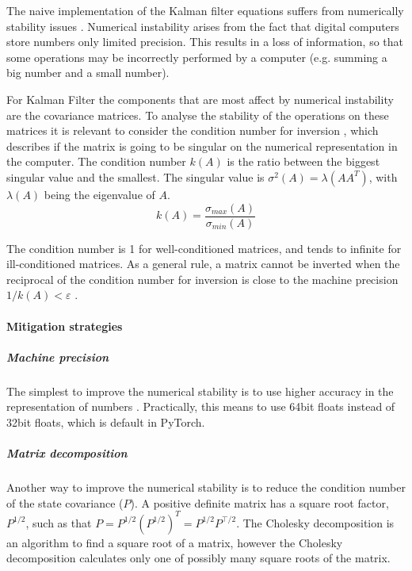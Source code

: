 \documentclass{article}
\begin{document}
The naive implementation of the Kalman filter equations suffers from numerically stability issues \cite{mohinder_s_grewal_kalman_2001, dan_simon_optimal_2006}. %
Numerical instability arises from the fact that digital computers store numbers only limited precision. This results in a loss of information, so that some operations may be incorrectly performed by a  computer (e.g. summing a big number and a small number).

For Kalman Filter the components that are most affect by numerical instability are the covariance matrices. To analyse the stability of the operations on these matrices it is relevant to consider the condition number for inversion \cite{mohinder_s_grewal_kalman_2001, kaminski_discrete_1971}, which describes if the matrix is going to be singular on the numerical representation in the computer. The condition number $k(A)$ is the ratio between the biggest singular value and the smallest. The singular value is $\sigma^2(A) = \lambda(AA^T)$, with  $\lambda(A)$ being the eigenvalue of $A$.
\begin{equation}\label{condition_number}
    k(A) = \frac{\sigma_{max}(A)}{\sigma_{min}(A)}
\end{equation}

The condition number is 1 for well-conditioned matrices, and tends to infinite for ill-conditioned matrices. As a general rule,  a matrix cannot be inverted when the reciprocal of the condition number for inversion is close to the machine precision $ 1/k(A) < \varepsilon$ \cite{mohinder_s_grewal_kalman_2001}.

\paragraph{Mitigation strategies}

\subparagraph{Machine precision} The simplest to improve the numerical stability is to use higher accuracy in the representation of numbers \cite{dan_simon_optimal_2006}. Practically, this means to use 64bit floats instead of 32bit floats, which is default in PyTorch.

\subparagraph{Matrix decomposition} Another way to improve the numerical stability is to reduce the condition number of the state covariance ($P$). A positive definite matrix has a square root factor, $P^{1/2}$, such as that $P = P^{1/2}(P^{1/2})^T=P^{1/2}P^{\top/2}$.
The Cholesky decomposition is an algorithm to find a square root of a matrix, however the Cholesky decomposition calculates only one of possibly many square roots of the matrix.
\end{document}
